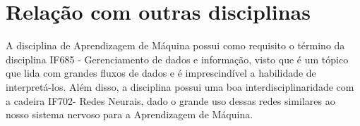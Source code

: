 \documentclass{article}
\begin{document}
\section{Relação com outras disciplinas}
A disciplina de Aprendizagem de Máquina possui como requisito o término da disciplina IF685 - Gerenciamento de dados e informação, visto que é um tópico que lida com grandes fluxos de dados e é imprescindível a habilidade de interpretá-los. Além disso, a disciplina possui uma boa interdisciplinaridade com a cadeira IF702- Redes Neurais, dado o grande uso dessas redes similares ao nosso sistema nervoso para a Aprendizagem de Máquina\cite{neural}. 



\end{document}
